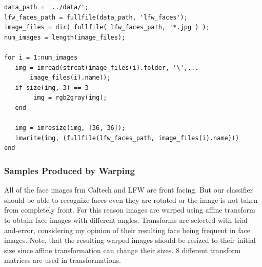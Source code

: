 \documentclass{article}
\begin{document}
\begin{lstlisting}[caption={MATLAB script for processing images taken from LFW database.},captionpos=b]
data_path = '../data/'; 
lfw_faces_path = fullfile(data_path, 'lfw_faces');
image_files = dir( fullfile( lfw_faces_path, '*.jpg') );
num_images = length(image_files);

for i = 1:num_images
   img = imread(strcat(image_files(i).folder, '\',...
       image_files(i).name));
   if size(img, 3) == 3
        img = rgb2gray(img);
   end
    
   img = imresize(img, [36, 36]);
   imwrite(img, (fullfile(lfw_faces_path, image_files(i).name)))
end
\end{lstlisting}

\subsubsection{Samples Produced by Warping}
All of the face images frın Caltech and LFW are front facing. But our classifier should be able to recognize faces even they are rotated or the image is not taken from completely front. For this reason images are warped using affine transform to obtain face images with different angles. Transforms are selected with trial-and-error, considering my opinion of their resulting face being frequent in face images. Note, that the resulting warped images should be resized to their initial size since affine transformation can change their sizes. 8 different transform matrices are used in transformations. 
\end{document}
